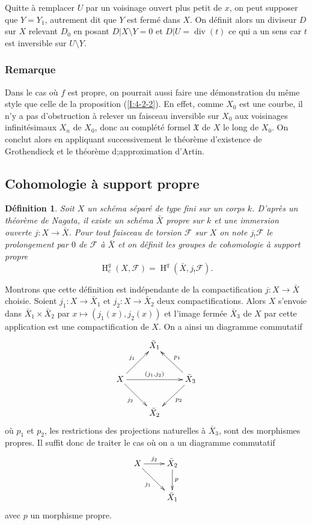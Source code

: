 \documentclass{book}
\DeclareMathOperator{\dv}{div}
\DeclareMathOperator{\h}{H}
\newcommand{\cF}{\mathcal{F}}
\newcommand{\fX}{\mathfrak{X}}
\newtheorem{definition}[subsubsection]{Définition}
\begin{document}
Quitte à remplacer $U$ par un voisinage ouvert plus petit de $x$, on peut 
supposer que $Y=Y_1$, autrement dit que $Y$ est fermé dans $X$. On définit 
alors un diviseur $D$ sur $X$ relevant $D_0$ en posant $D|X\setminus Y=0$ et 
$D|U=\dv(t)$ ce qui a un sens car $t$ est inversible sur $U\setminus Y$. 





\subsubsection{Remarque}\label{I:4-4-2}

Dans le cas où $f$ est propre, on pourrait aussi faire une démonstration 
du même style que celle de la proposition (\ref{I:4-2-2}). En effet, comme 
$X_0$ est une courbe, il n'y a pas d'obstruction à relever un faisceau 
inversible sur $X_0$ aux voisinages infinitésimaux $X_n$ de $X_0$, donc au 
complété formel $\fX$ de $X$ le long de $X_0$. On conclut alors en 
appliquant successivement le théorème d'existence de Grothendieck et le 
théorème d;approximation d'Artin. 










\subsection{Cohomologie à support propre}\label{I:4-5}





\begin{definition}\label{I:4-5-1}
Soit $X$ un schéma séparé de type fini sur un corps $k$. D'après un 
théorème de Nagata, il existe un schéma $\bar X$ propre sur $k$ et une 
immersion ouverte $j:X\to\bar X$. Pour tout faisceau de torsion $\cF$ sur $X$ on 
note $j_! \cF$ le prolongement par $0$ de $\cF$ à $\bar X$ et on définit les 
groupes de \emph{cohomologie à support propre} 
\[
  \h_c^q(X,\cF)=\h^q(\bar X, j_! \cF) \text{.}
\]
\end{definition}

Montrons que cette définition est indépendante de la compactification 
$j:X\to\bar X$ choisie. Soient $j_1:X\to \bar X_1$ et $j_2:X\to \bar X_2$ deux 
compactifications. Alors $X$ s'envoie dans $\bar X_1\times \bar X_2$ par 
$x\mapsto (j_1(x),j_2(x))$ et l'image fermée $\bar X_3$ de $X$ par cette 
application est une compactification de $X$. On a ainsi un diagramme commutatif 
\[\xymatrix{
  & \bar X_1 \\
  X \ar[ur]^-{j_1} \ar[rr]^-{(j_1,j_2)} \ar[dr]_-{j_2} 
    & & \bar X_3 \ar[ul]_-{p_1} \ar[dl]^-{p_2} \\
  & \bar X_2
}\]
où $p_1$ et $p_2$, les restrictions des projections naturelles à 
$\bar X_3$, sont des morphismes propres. Il suffit donc de traiter le cas où 
on a un diagramme commutatif 
\[\xymatrix{
  X \ar[r]^-{j_2} \ar[dr]_-{j_1} 
    & \bar X_2 \ar[d]^-p \\
  & \bar X_1
}\]
avec $p$ un morphisme propre. 
\end{document}
